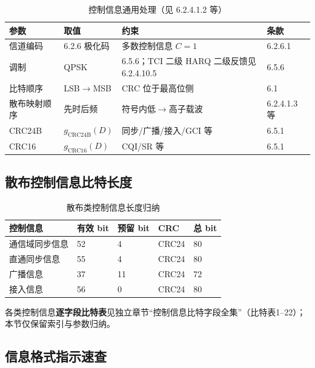 \documentclass[11pt,a4paper]{ctexart}
\begin{document}
\begin{table}[h]
\centering
\small
\caption{控制信息通用处理（见 6.2.4.1.2 等）}
\begin{tabular}{llll}
\toprule
\textbf{参数} & \textbf{取值} & \textbf{约束} & \textbf{条款} \\
\midrule
信道编码 & 6.2.6 极化码 & 多数控制信息 $C{=}1$ & 6.2.6.1 \\
调制 & QPSK & 6.5.6；TCI 二级 HARQ 二级反馈见 6.2.4.10.5 & 6.5.6 \\
比特顺序 & LSB$\rightarrow$MSB & CRC 位于最高位侧 & 6.1 \\
散布映射顺序 & 先时后频 & 符号内低$\rightarrow$高子载波 & 6.2.4.1.3 等 \\
CRC24B & $g_{\mathrm{CRC24B}}(D)$ & 同步/广播/接入/GCI 等 & 6.5.1 \\
CRC16 & $g_{\mathrm{CRC16}}(D)$ & CQI/SR 等 & 6.5.1 \\
\bottomrule
\end{tabular}
\end{table}

\subsection{散布控制信息比特长度}

\begin{table}[h]
\centering
\small
\caption{散布类控制信息长度归纳}
\begin{tabular}{lllll}
\toprule
\textbf{控制信息} & \textbf{有效 bit} & \textbf{预留 bit} & \textbf{CRC} & \textbf{总 bit} \\
\midrule
通信域同步信息 & 52 & 4 & CRC24 & 80 \\
直通同步信息 & 55 & 4 & CRC24 & 80 \\
广播信息 & 37 & 11 & CRC24 & 72 \\
接入信息 & 56 & 0 & CRC24 & 80 \\
\bottomrule
\end{tabular}
\end{table}

\noindent 各类控制信息\textbf{逐字段比特表}见独立章节``控制信息比特字段全集''（比特表1--22）；本节仅保留索引与参数归纳。

\subsection{信息格式指示速查}
\end{document}
